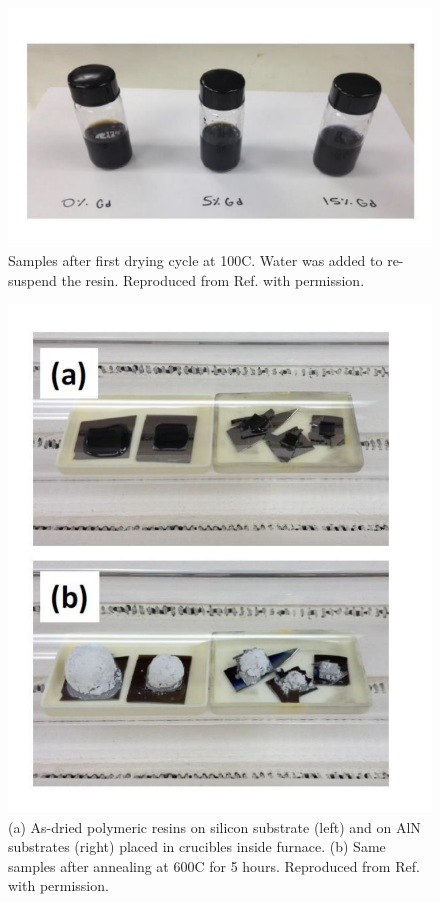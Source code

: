 \begin{figure}
    \centering
    \includegraphics[scale=.35]{Figures/Resin.pdf}
    \caption{Samples after first drying cycle at 100\textdegree C. Water was added to re-suspend the resin. Reproduced from Ref. \cite{GCamata2015} with permission.}
    \label{fig:resin}
\end{figure}

\begin{figure}
    \centering
    \includegraphics[scale=.75]{Figures/Temp_Treat.pdf}
    \caption{(a) As-dried polymeric resins on silicon substrate (left) and on AlN substrates (right) placed in crucibles inside furnace. (b) Same samples after annealing at 600\textdegree C for 5 hours. Reproduced from Ref. \cite{GCamata2015} with permission.}
    \label{fig:temp:treat}
\end{figure}


